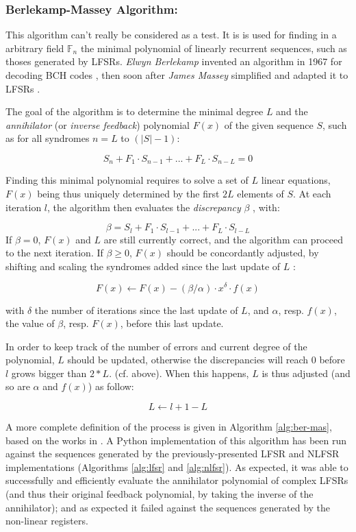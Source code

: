 \documentclass{llncs}
\begin{document}
\subsubsection{Berlekamp-Massey Algorithm:} This algorithm can't really be considered as a test. It is is used for finding in a arbitrary field $\mathbb{F}_n$ the minimal polynomial of linearly recurrent sequences, such as thoses generated by LFSRs. \emph{Elwyn Berlekamp} invented an algorithm in 1967 for decoding BCH codes \cite{berle}, then soon after \emph{James Massey} simplified and adapted it to LFSRs \cite{mass}.

The goal of the algorithm is to determine the minimal degree $L$ and the \emph{annihilator} (or \emph{inverse feedback}) polynomial $F(x)$ of the given sequence $S$, such as for all syndromes $n = L$ to $(|S|-1)$:

$$S_n + F_1 \cdot S_{n-1} + ... + F_L \cdot S_{n-L} = 0$$

Finding this minimal polynomial requires to solve a set of $L$ linear equations, $F(x)$ being thus uniquely determined by the first $2L$ elements of $S$. At each iteration $l$, the algorithm then evaluates the \emph{discrepancy} $\beta$ \cite{joux,feng:tzeng}, with:

$$ \beta = S_l + F_1 \cdot S_{l-1} + ... + F_L \cdot S_{l-L}$$
If $\beta = 0$, $F(x)$ and $L$ are still currently correct, and the algorithm can proceed to the next iteration. If $\beta \geq 0$, $F(x)$ should be concordantly adjusted, by shifting and scaling the syndromes added since the last update of $L$ \cite{joux}:

$$F(x) \gets F(x) - (\beta/\alpha) \cdot x^\delta \cdot f(x)$$


with $\delta$ the number of iterations since the last update of $L$, and $\alpha$, resp. $f(x)$, the value of $\beta$, resp. $F(x)$, before this last update.

In order to keep track of the number of errors and current degree of the polynomial, $L$ should be updated, otherwise  the discrepancies will reach $0$ before $l$ grows bigger than $2*L$. (cf. above). When this happens, $L$ is thus adjusted (and so are $\alpha$ and $f(x)$) as follow:

$$L \gets l + 1 - L$$

A more complete definition of the process is given in Algorithm \ref{alg:ber-mas}, based on the works in \cite{joux,rodri}. A Python implementation of this algorithm has been run against the sequences generated by the previously-presented LFSR and NLFSR implementations (Algorithms \ref{alg:lfsr} and \ref{alg:nlfsr}). As expected, it was able to successfully and efficiently evaluate the annihilator polynomial of complex LFSRs (and thus their original feedback polynomial, by taking the inverse of the annihilator); and as expected it failed against the sequences generated by the non-linear registers.
\end{document}
